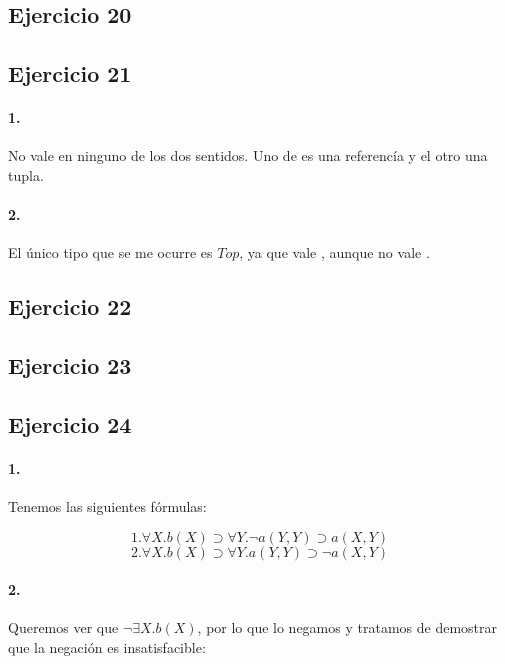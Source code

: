 \subsection*{Ejercicio 20}


\subsection*{Ejercicio 21}

\paragraph{1.} No vale en ninguno de los dos sentidos. Uno de es una referencía y el otro una tupla.

\paragraph{2.} El único tipo que se me ocurre es $Top$, ya que vale , aunque no vale .

\subsection*{Ejercicio 22}


\subsection*{Ejercicio 23}


\subsection*{Ejercicio 24}

\paragraph{1.} Tenemos las siguientes fórmulas:

\[1. \forall X. b(X) \supset \forall Y. \lnot a(Y,Y) \supset a(X,Y)\]
\[2. \forall X. b(X) \supset \forall Y. a(Y,Y) \supset \lnot a(X,Y)\]

\paragraph{2.} Queremos ver que $\lnot \exists X. b(X)$, por lo que lo negamos y tratamos de demostrar que la negación es insatisfacible:

